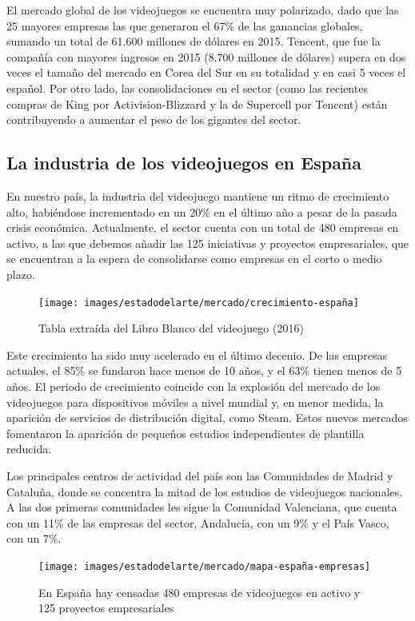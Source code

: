 El mercado global de los videojuegos se encuentra muy polarizado, dado que las 25 mayores empresas las que generaron el 67\% de las ganancias globales, sumando un total de 61.600 millones de dólares en 2015. Tencent, que fue la compañía con mayores ingresos en 2015 (8.700 millones de dólares) supera en dos veces el tamaño del mercado en Corea del Sur en su totalidad y en casi 5 veces el español. Por otro lado, las consolidaciones en el sector (como las recientes compras de King por Activision-Blizzard\cite{compra_king} y la de Supercell por Tencent\cite{compra_supercell}) están contribuyendo a aumentar el peso de los gigantes del sector.

\subsection{La industria de los videojuegos en España}
En nuestro país, la industria del videojuego mantiene un ritmo de crecimiento alto, habiéndose incrementado en un 20\% en el último año a pesar de la pasada crisis económica. Actualmente, el sector cuenta con un total de 480 empresas en activo, a las que debemos añadir las 125 iniciativas y proyectos empresariales, que se encuentran a la espera de consolidarse como empresas en el corto o medio plazo.

\begin{figure}[h]
    \centering
    \texttt{[image: images/estadodelarte/mercado/crecimiento-españa]}
    \caption{Tabla extraída del Libro Blanco del videojuego (2016)}
\end{figure}

Este crecimiento ha sido muy acelerado en el último decenio. De las empresas actuales, el 85\% se fundaron hace menos de 10 años, y el 63\% tienen menos de 5 años. El periodo de crecimiento coincide con la explosión del mercado de los videojuegos para dispositivos móviles a nivel mundial y, en menor medida, la aparición de servicios de distribución digital, como Steam. Estos nuevos mercados fomentaron la aparición de pequeños estudios independientes de plantilla reducida.

Los principales centros de actividad del país son las Comunidades de Madrid y Cataluña, donde se concentra la mitad de los estudios de videojuegos nacionales. A las dos primeras comunidades les sigue la Comunidad Valenciana, que cuenta con un 11\% de las empresas del sector, Andalucía, con un 9\% y el País Vasco, con un 7\%.

\begin{figure}[h]
    \centering
    \texttt{[image: images/estadodelarte/mercado/mapa-españa-empresas]}
    \caption{En España hay censadas 480 empresas de videojuegos en activo y 125 proyectos empresariales}
\end{figure}

